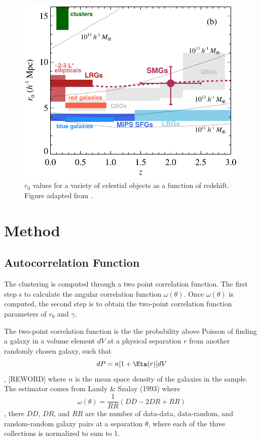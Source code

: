 \begin{figure}[tbp]
\centering \includegraphics[width=120mm]{clustering/Hickox2012_Compare.png}
\caption{$r_0$ values for a variety of celestial objects as a function of redshift. Figure adapted from \cite{10.1111/j.1365-2966.2011.20303.x}.}
\label{fig:Hickox_compare}
\end{figure}

\section{Method}

\subsection{Autocorrelation Function}

The clustering is computed through a two point correlation function. The first step s to calculate the angular correlation function $ \omega(\theta)$. Once $ \omega(\theta)$ is computed, the second step is to obtain the two-point correlation function parameters of $r_0$ and $\gamma$.

The two-point correlation function is the the probability above Poisson of finding a galaxy in a volume element $dV$ at a physical separation $r$ from another randomly chosen galaxy, such that $$ dP = n[1 + \Eta(r)]dV$$, [REWORD] where $n$ is the mean space density of the galaxies in the sample. The estimator comes from Landy \& Szalay (1993) where $$ \omega(\theta) = \frac{1}{RR}(DD-2DR + RR)$$, there $DD$, $DR$, and $RR$ are the number of data-data, data-random, and random-random galaxy pairs at a separation $\theta$, where each of the three collections is normalized to sum to 1. 

